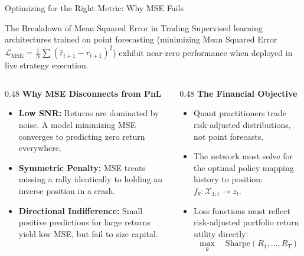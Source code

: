 \documentclass[10pt]{beamer}
\begin{document}
\begin{frame}{Optimizing for the Right Metric: Why MSE Fails}
  \begin{block}{The Breakdown of Mean Squared Error in Trading}
    Supervised learning architectures trained on point forecasting (minimizing Mean Squared Error $\mathcal{L}_{\text{MSE}} = \frac{1}{N}\sum (\hat{r}_{t+1} - r_{t+1})^2$) exhibit near-zero performance when deployed in live strategy execution.
  \end{block}
  \vspace{0.1cm}
  \begin{columns}[t]
    \begin{column}{0.48\textwidth}
      \textbf{Why MSE Disconnects from PnL}
      \begin{itemize}\scriptsize
        \item \textbf{Low SNR:} Returns are dominated by noise. A model minimizing MSE converges to predicting zero return everywhere.
        \item \textbf{Symmetric Penalty:} MSE treats missing a rally identically to holding an inverse position in a crash.
        \item \textbf{Directional Indifference:} Small positive predictions for large returns yield low MSE, but fail to size capital.
      \end{itemize}
    \end{column}
    \begin{column}{0.48\textwidth}
      \textbf{The Financial Objective}
      \begin{itemize}\scriptsize
        \item Quant practitioners trade risk-adjusted distributions, not point forecasts.
        \item The network must solve for the optimal policy mapping history to position: $f_\theta: \mathcal{X}_{1:t} \to z_t$.
        \item Loss functions must reflect risk-adjusted portfolio return utility directly:
        \begin{equation*}
          \max_\theta \quad \text{Sharpe}(R_1, \dots, R_T)
        \end{equation*}
      \end{itemize}
    \end{column}
  \end{columns}
\end{frame}
\end{document}
